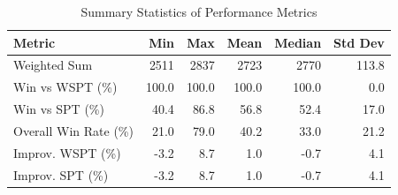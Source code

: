 \begin{table}[htbp]%
\centering%
\begin{tabular}{lrrrrr}%
\toprule%
\textbf{Metric}&\textbf{Min}&\textbf{Max}&\textbf{Mean}&\textbf{Median}&\textbf{Std Dev}\\%
\midrule%
Weighted Sum&2511&2837&2723&2770&113.8\\%
Win vs WSPT (\%)&100.0&100.0&100.0&100.0&0.0\\%
Win vs SPT (\%)&40.4&86.8&56.8&52.4&17.0\\%
Overall Win Rate (\%)&21.0&79.0&40.2&33.0&21.2\\%
Improv. WSPT (\%)&-3.2&8.7&1.0&-0.7&4.1\\%
Improv. SPT (\%)&-3.2&8.7&1.0&-0.7&4.1\\%
\bottomrule%
\end{tabular}%
\caption{Summary Statistics of Performance Metrics}%
\label{tab:metrics}%
\end{table}